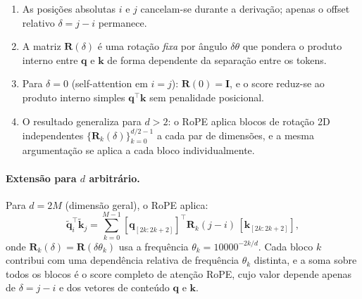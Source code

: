 \documentclass{dlproblemset}
\begin{document}
\begin{enumerate}[1.]
  \item As posições absolutas $i$ e $j$ cancelam-se durante a derivação; apenas o
        offset relativo $\delta = j - i$ permanece.
  \item A matriz $\mathbf{R}(\delta)$ é uma rotação \emph{fixa} por ângulo $\delta\theta$ que
        pondera o produto interno entre $\mathbf{q}$ e $\mathbf{k}$ de forma dependente
        da separação entre os tokens.
  \item Para $\delta = 0$ (self-attention em $i = j$): $\mathbf{R}(0) = \mathbf{I}$, e o score reduz-se
        ao produto interno simples $\mathbf{q}^\top \mathbf{k}$ sem penalidade posicional.
  \item O resultado generaliza para $d > 2$: o RoPE aplica blocos de rotação 2D
        independentes $\{\mathbf{R}_k(\delta)\}_{k=0}^{d/2-1}$ a cada par de dimensões,
        e a mesma argumentação se aplica a cada bloco individualmente.
\end{enumerate}

\paragraph{Extensão para $d$ arbitrário.}

Para $d = 2M$ (dimensão geral), o RoPE aplica:
\[
  \tilde{\mathbf{q}}_i^\top \tilde{\mathbf{k}}_j
  = \sum_{k=0}^{M-1}
    \left[\mathbf{q}_{[2k:2k+2]}\right]^\top
    \mathbf{R}_k(j-i)\,
    \left[\mathbf{k}_{[2k:2k+2]}\right],
\]
onde $\mathbf{R}_k(\delta) = \mathbf{R}(\delta\theta_k)$ usa a frequência $\theta_k = 10000^{-2k/d}$.
Cada bloco $k$ contribui com uma dependência relativa de frequência $\theta_k$
distinta, e a soma sobre todos os blocos é o score completo de atenção RoPE,
cujo valor depende apenas de $\delta = j-i$ e dos vetores de conteúdo
$\mathbf{q}$ e $\mathbf{k}$.
\end{document}
